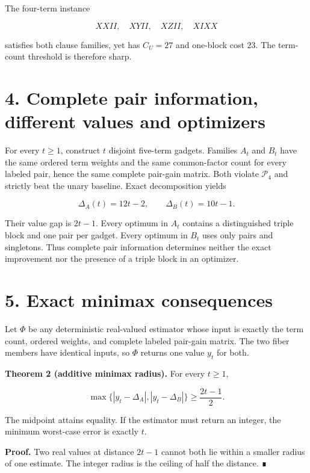 \documentclass[
  11pt,
]{article}
\begin{document}
The four-term instance

\[
XXII, \quad XYII, \quad XZII, \quad XIXX
\]

satisfies both clause families, yet has \(C_U=27\) and one-block cost
\(23\). The term-count threshold is therefore sharp.

\hypertarget{complete-pair-information-different-values-and-optimizers}{%
\section{4. Complete pair information, different values and
optimizers}\label{complete-pair-information-different-values-and-optimizers}}

For every \(t\ge1\), construct \(t\) disjoint five-term gadgets.
Families \(A_t\) and \(B_t\) have the same ordered term weights and the
same common-factor count for every labeled pair, hence the same complete
pair-gain matrix. Both violate \(\mathcal P_4\) and strictly beat the
unary baseline. Exact decomposition yields

\[
\Delta_A(t)=12t-2,
\qquad
\Delta_B(t)=10t-1.
\]

Their value gap is \(2t-1\). Every optimum in \(A_t\) contains a
distinguished triple block and one pair per gadget. Every optimum in
\(B_t\) uses only pairs and singletons. Thus complete pair information
determines neither the exact improvement nor the presence of a triple
block in an optimizer.

\hypertarget{exact-minimax-consequences}{%
\section{5. Exact minimax
consequences}\label{exact-minimax-consequences}}

Let \(\Phi\) be any deterministic real-valued estimator whose input is
exactly the term count, ordered weights, and complete labeled pair-gain
matrix. The two fiber members have identical inputs, so \(\Phi\) returns
one value \(y_t\) for both.

\textbf{Theorem 2 (additive minimax radius).} For every \(t\ge1\),

\[
\max\{|y_t-\Delta_A|,|y_t-\Delta_B|\}
\ge \frac{2t-1}{2}.
\]

The midpoint attains equality. If the estimator must return an integer,
the minimum worst-case error is exactly \(t\).

\textbf{Proof.} Two real values at distance \(2t-1\) cannot both lie
within a smaller radius of one estimate. The integer radius is the
ceiling of half the distance. ∎
\end{document}
